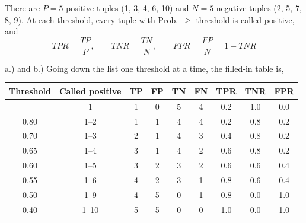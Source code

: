 \documentclass[12pt,letterpaper, onecolumn]{exam}
\begin{document}
\begin{questions}
    \begin{solution}

        There are $P=5$ positive tuples (1, 3, 4, 6, 10) and $N=5$ negative tuples (2, 5, 7, 8, 9). At each threshold, every tuple with Prob.\ $\geq$ threshold is called positive, and
        \begin{equation*}
            TPR = \frac{TP}{P},\qquad TNR = \frac{TN}{N},\qquad FPR = \frac{FP}{N} = 1-TNR
        \end{equation*}

        a.) and b.) Going down the list one threshold at a time, the filled-in table is,

            {\small
            \begin{longtable}{|c|c|c|c|c|c|c|c|c|}
                \hline Threshold & Called positive & TP & FP & TN & FN & TPR & TNR & FPR \\ \hline
                \endhead
                \hline
                \endfoot
                0.90 & 1 & 1 & 0 & 5 & 4 & 0.2 & 1.0 & 0.0 \\
                0.80 & 1--2 & 1 & 1 & 4 & 4 & 0.2 & 0.8 & 0.2 \\
                0.70 & 1--3 & 2 & 1 & 4 & 3 & 0.4 & 0.8 & 0.2 \\
                0.65 & 1--4 & 3 & 1 & 4 & 2 & 0.6 & 0.8 & 0.2 \\
                0.60 & 1--5 & 3 & 2 & 3 & 2 & 0.6 & 0.6 & 0.4 \\
                0.55 & 1--6 & 4 & 2 & 3 & 1 & 0.8 & 0.6 & 0.4 \\
                0.50 & 1--9 & 4 & 5 & 0 & 1 & 0.8 & 0.0 & 1.0 \\
                0.40 & 1--10 & 5 & 5 & 0 & 0 & 1.0 & 0.0 & 1.0
            \end{longtable}
            }


\end{solution}
\end{questions}
\end{document}
